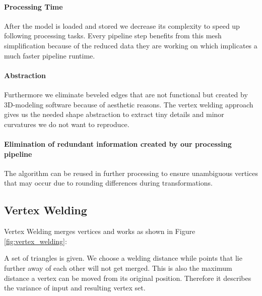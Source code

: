 \documentclass[../ClassicThesis.tex]{subfiles}
\begin{document}
\paragraph*{Processing Time}

After the model is loaded and stored we decrease its complexity to speed up following processing tasks. Every pipeline step benefits from this mesh simplification because of the reduced data they are working on which implicates a much faster pipeline runtime. 

\paragraph*{Abstraction}

Furthermore we eliminate beveled edges that are not functional but created by 3D-modeling software because of aesthetic reasons. The vertex welding approach gives us the needed shape abstraction to extract tiny details and minor curvatures we do not want to reproduce. 

\paragraph*{Elimination of redundant information created by our processing pipeline}

The algorithm can be reused in further processing to ensure unambiguous vertices that may occur due to rounding differences during transformations.



\subsection{Vertex Welding}










Vertex Welding merges vertices and works as shown in Figure \ref{fig:vertex_welding}: 

A set of triangles is given. We choose a welding distance while points that lie further away of each other will not get merged. This is also the maximum distance a vertex can be moved from its original position. Therefore it describes the variance of input and resulting vertex set. 
\end{document}
